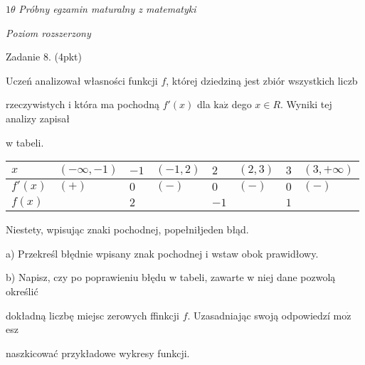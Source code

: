 \documentclass[a4paper,12pt]{article}
\begin{document}
$ 1\theta$ {\it Próbny egzamin maturalny z matematyki}

{\it Poziom rozszerzony}

Zadanie 8. (4pkt)

Uczeń analizował własności funkcji $f$, której dziedziną jest zbiór wszystkich liczb

rzeczywistych i która ma pochodną $f'(x)$ dla $\mathrm{k}\mathrm{a}\dot{\mathrm{z}}$ dego $x\in R$. Wyniki tej analizy zapisał

w tabeli.
\begin{center}
\begin{tabular}{|l|l|l|l|l|l|l|l|}
\hline
\multicolumn{1}{|l|}{$x$}&	\multicolumn{1}{|l|}{ $(-\infty,-1)$}&	\multicolumn{1}{|l|}{ $-1$}&	\multicolumn{1}{|l|}{ $(-1,2)$}&	\multicolumn{1}{|l|}{ $2$}&	\multicolumn{1}{|l|}{ $(2,3)$}&	\multicolumn{1}{|l|}{ $3$}&	\multicolumn{1}{|l|}{ $(3,+\infty)$}	\\
\hline
\multicolumn{1}{|l|}{ $f'(x)$}&	\multicolumn{1}{|l|}{ $(+)$}&	\multicolumn{1}{|l|}{ $0$}&	\multicolumn{1}{|l|}{ $(-)$}&	\multicolumn{1}{|l|}{ $0$}&	\multicolumn{1}{|l|}{ $(-)$}&	\multicolumn{1}{|l|}{ $0$}&	\multicolumn{1}{|l|}{ $(-)$}	\\
\hline
\multicolumn{1}{|l|}{ $f(x)$}&	\multicolumn{1}{|l|}{}&	\multicolumn{1}{|l|}{ $2$}&	\multicolumn{1}{|l|}{}&	\multicolumn{1}{|l|}{ $-1$}&	\multicolumn{1}{|l|}{}&	\multicolumn{1}{|l|}{ $1$}&	\multicolumn{1}{|l|}{}	\\
\hline
\end{tabular}

\end{center}
Niestety, wpisując znaki pochodnej, popełniłjeden błąd.

a) Przekreśl błędnie wpisany znak pochodnej i wstaw obok prawidłowy.

b) Napisz, czy po poprawieniu błędu w tabeli, zawarte w niej dane pozwolą określić

dokładną liczbę miejsc zerowych ffinkcji $f$. Uzasadniając swoją odpowiedzí $\mathrm{m}\mathrm{o}\dot{\mathrm{z}}$ esz

naszkicować przykładowe wykresy funkcji.
\end{document}
